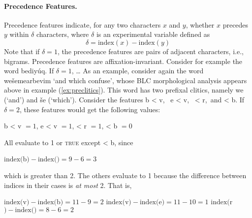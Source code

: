 \paragraph{Precedence Features.}
Precedence features indicate, for any two characters $x$ and $y$,
whether $x$ precedes $y$ within $\delta$ characters,
where $\delta$ is an experimental variable defined as
	\begin{equation}\label{eq:indexdif}
	\delta = \text{index}(x) - \text{index}(y)
	\end{equation}
Note that if $\delta = 1$, the precedence features are 
pairs of adjacent characters, i.e., bigrams.
Precedence features are affixation-invariant. 
Consider for example the word \textsf{bediy\'uq}. 
If $\delta = 1$, \dots 
As an example, consider again the word 
\textsf{we\v{s}emearbevim} `and which confuse', 
whose \ac{BLC} morphological 
analysis appears above in example (\ref{ex:preclitics}). 
This word has two prefixal clitics, namely \textsf{we} 
(`and') and \textsf{\v{s}e} (`which'). %
Consider the features \textsf{b < v}, \, \textsf{e < v}, \,\textsf{ < r},\, and \textsf{ < b}. If $\delta=2$, these features would get the 
following values: 
\begin{exe}	
	\ex \textsf{b < v} $ =1 $, \qquad \textsf{e < v} $ =1 $, \qquad\textsf{ < r} $ =1$, \qquad \textsf{< b} $=0$
\end{exe}

All evaluate to 1 or \textsc{true} except \textsf{ < b}, since
\begin{exe}
	\ex $\text{index}($\textsf{b}$) - \text{index}($\textsf{\textrevglotstop}$) = 9 - 6 = 3$
\end{exe}
which is greater than 2.
The others evaluate to 1 because the difference between indices in their cases is \emph{at most} 2. That is,
\begin{exe}
    \ex \begin{xlist}
	\ex $\text{index}($\textsf{v}$) - \text{index}($\textsf{b}$) = 11 - 9 = 2$ 
	\ex $\text{index}($\textsf{v}$) - \text{index}($\textsf{e}$) = 11 - 10 = 1$ 
	\ex $\text{index}($\textsf{r}$) - \text{index}($\textsf{\textrevglotstop}$) = 8 - 6 = 2 $
    \end{xlist}
\end{exe}

